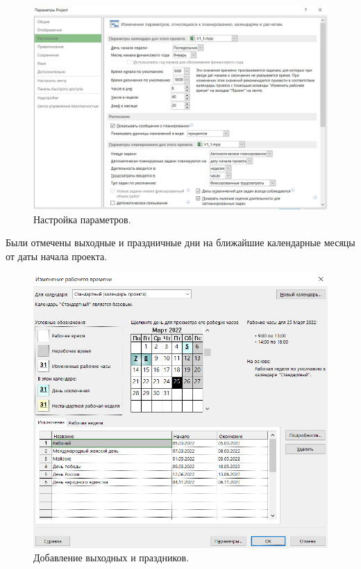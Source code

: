 \documentclass[a4paper,14pt]{extreport} %
\begin{document}
\begin{enumerate}
\begin{figure}[H]
  \centering
  \caption{Настройка параметров. }
  \includegraphics[scale=0.48]{calendar}
\end{figure}

Были отмечены выходные и праздничные дни на ближайшие календарные месяцы от даты начала проекта.

\begin{figure}[H]
  \centering
  \caption{Добавление выходных и праздников. }
  \includegraphics[scale=0.48]{holiday}
\end{figure}


\end{enumerate}
\end{document}
